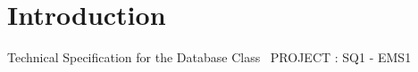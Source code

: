 \hypertarget{index_intro_sec}{}\section{Introduction}\label{index_intro_sec}
Technical Specification for the Database Class~\newline
 P\+R\+O\+J\+E\+C\+T \+: S\+Q1 -\/ E\+M\+S1~\newline
 
